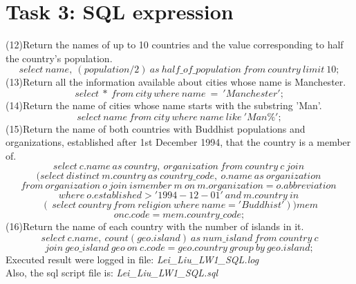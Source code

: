 \documentclass[11pt, twocolumn]{article}
\begin{document}
\section{Task 3: SQL expression}
(12)Return the names of up to 10 countries and the value corresponding to half the country’s population.$$select \ name, \ (population/2) \  as \ half\_of\_population \ 
from \ country \ limit \ 10;$$
(13)Return all the information available about cities whose name is Manchester.$$select \ * \ from \ city \ where \ name\ =\ 'Manchester';$$
(14)Return the name of cities whose name starts with the substring 'Man’.$$select \ name \ from \ city \ where \ name \ like \ 'Man\%';$$
(15)Return the name of both countries with Buddhist populations and organizations, established after 1st December 1994, that the country is a member of.
$$select \ c.name \ as \ country, \  organization \ from \ country \ c \ join \ $$ $$(select \ distinct \ m.country \ as \ country\_code, \ o.name \ as \ organization \ 	$$$$from \ organization \ o \ join \ ismember \ m \ on \ m.organization=o.abbreviation \ $$ $$where \ o.established > '1994-12-01' \ and \ m.country \ in \ $$ $$( \ select \ country \ from \ religion \ where \ name='Buddhist' ) ) mem $$ $$on c.code = mem.country\_code;$$
(16)Return the name of each country with the number of islands in it.
$$select \ c.name, \ count(geo.island) \ as \ num\_island \ from \ country \ c $$$$ join \ geo\_island \ geo \ on \ c.code=geo.country \ group \ by \ geo.island;$$
Executed result were logged in file: \textit{Lei\_Liu\_LW1\_SQL.log}\\
Also, the sql script file is: \textit{Lei\_Liu\_LW1\_SQL.sql}
\end{document}
